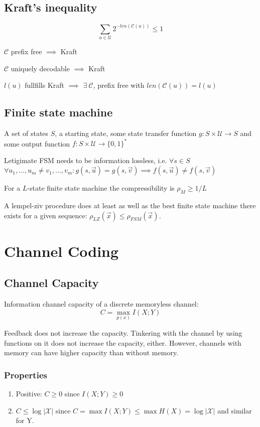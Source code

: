 \documentclass[10pt,a4paper,landscape]{article}
\newcommand{\code}{\mathcal{C}}
\newcommand{\alphabet}{\mathcal{U}}
\begin{document}
\begin{multicols*}{4}
\subsection{Kraft's inequality}
$$\sum_{u \in \alphabet} 2^{-len(\code(u))} \leq 1$$

$\code$ prefix free $\implies$ Kraft

$\code$ uniquely decodable $\implies$ Kraft

$l(u)$ fullfills Kraft $\implies$ $\exists \ \code$, prefix free with $len(\code(u)) = l(u)$

\subsection{Finite state machine}
A set of states $S$, a starting state, some state transfer function $g: S \times \alphabet \rightarrow S$ and some output function $f: S \times \alphabet \rightarrow \{0,1\}^*$

Letigimate FSM needs to be information lossless, i.e. $\forall s \in S$ $\forall u_1, ..., u_m \neq v_1, ..., v_m: g(s, \vec u) = g(s, \vec v) \implies f(s, \vec u) \neq f(s, \vec v)$

For a $L$-state finite state machine the compressibility is $\rho_M \geq 1/L$

A lempel-ziv procedure does at least as well as the best finite state machine there exists for a given sequence: $\rho_{LZ}(\vec x) \leq \rho_{FSM}(\vec x)$.

\section{Channel Coding}
\subsection{Channel Capacity}
Information channel capacity of a discrete memoryless channel:
$$C = \max_{p(x)} I(X; Y)$$

Feedback does not increase the capacity. Tinkering with the channel by using functions on it does not increase the capacity, either. However, channels with memory can have higher capacity than without memory.

\subsubsection{Properties}
\begin{enumerate}
	\item Positive: $C \geq 0$ since $I(X; Y) \geq 0$
	\item $C \leq \log | \mathcal{X} |$ since $C = \max I(X; Y) \leq \max H(X) =  \log | \mathcal{X} |$ and similar for Y.
\end{enumerate}


\end{multicols*}
\end{document}
